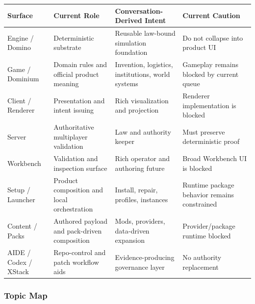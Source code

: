 \documentclass[9pt,a4paper,openany]{book}
\newcommand{\toprule}{\hline}
\newcommand{\midrule}{\hline}
\newcommand{\bottomrule}{\hline}
\begin{document}
\begin{center}
{\small\renewcommand{\arraystretch}{1.18}
\begin{tabularx}{\linewidth}{@{}>{\raggedright\arraybackslash}X >{\raggedright\arraybackslash}X >{\raggedright\arraybackslash}X >{\raggedright\arraybackslash}X@{}}
\toprule
\textbf{Surface} & \textbf{Current Role} & \textbf{Conversation-\allowbreak{}Derived Intent} & \textbf{Current Caution} \\
\midrule
Engine /\allowbreak{} Domino & Deterministic substrate & Reusable law-\allowbreak{}bound simulation foundation & Do not collapse into product UI \\
Game /\allowbreak{} Dominium & Domain rules and official product meaning & Invention, logistics, institutions, world systems & Gameplay remains blocked by current queue \\
Client /\allowbreak{} Renderer & Presentation and intent issuing & Rich visualization and projection & Renderer implementation is blocked \\
Server & Authoritative multiplayer validation & Law and authority keeper & Must preserve deterministic proof \\
Workbench & Validation and inspection surface & Rich operator and authoring future & Broad Workbench UI is blocked \\
Setup /\allowbreak{} Launcher & Product composition and local orchestration & Install, repair, profiles, instances & Runtime package behavior remains constrained \\
Content /\allowbreak{} Packs & Authored payload and pack-\allowbreak{}driven composition & Mods, providers, data-\allowbreak{}driven expansion & Provider/\allowbreak{}package runtime blocked \\
AIDE /\allowbreak{} Codex /\allowbreak{} XStack & Repo-\allowbreak{}control and patch workflow aids & Evidence-\allowbreak{}producing governance layer & No authority replacement \\
\bottomrule
\end{tabularx}
}
\end{center}

\subsubsection{Topic Map}
\end{document}
